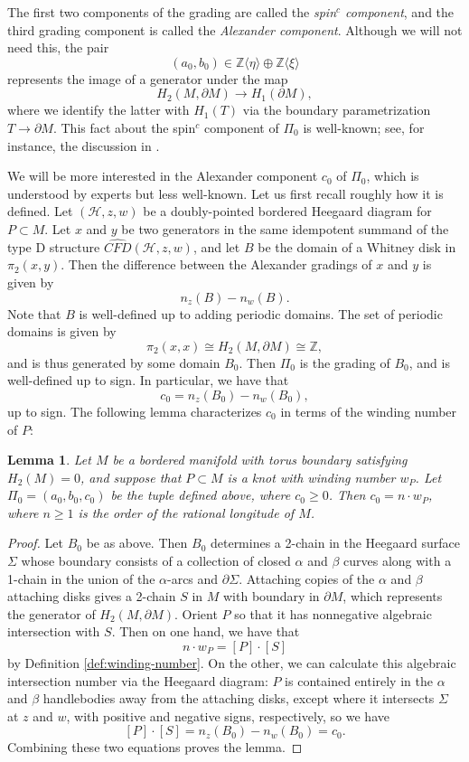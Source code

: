 \documentclass[11pt]{amsart}
\newtheorem {lemma}[theorem]{Lemma}
\numberwithin{equation}{section}
\numberwithin{theorem}{section}
\theoremstyle{definition}
\newcommand{\Z}{\mathbb{Z}}
\newcommand{\CFD}{\widehat{\mathit{CFD}}}
\begin{document}
The first two components of the grading are called the \emph{spin$^c$ component}, and the third grading component is called the \emph{Alexander component}. Although we will not need this, the pair \[(a_0,b_0)\in\Z\langle \eta\rangle \oplus \Z\langle \xi\rangle\] represents the image of a generator under the map \[H_2(M,\partial M) \to H_1(\partial M),\] where we identify the latter with $H_1(T)$ via the boundary parametrization $T \to \partial M$. This fact about the spin$^c$ component of $\Pi_0$ is well-known; see, for instance, the discussion in \cite[\S2.2]{hrw-properties}.

We will be more interested in the Alexander component $c_0$ of $\Pi_0$, which is understood by experts but less well-known. Let us first recall roughly how it is defined. Let $(\mathcal{H},z,w)$ be a doubly-pointed bordered Heegaard diagram for $P\subset M$. Let  $x$ and $y$ be two generators in the same idempotent summand of the type D structure $\CFD(\mathcal{H},z,w)$, and let $B$ be the domain of a Whitney disk in $\pi_2(x,y)$. Then the difference between the Alexander gradings of $x$ and $y$ is given by \[n_z(B)-n_w(B).\] Note that $B$ is well-defined up to adding periodic domains.  The set of periodic domains is given by \[\pi_2(x,x)\cong H_2(M,\partial M) \cong \Z,\] and is thus generated by some domain $B_0$. Then $\Pi_0$ is the grading of $B_0$, and is well-defined up to sign. In particular, we have that \[c_0 = n_z(B_0)-n_w(B_0),\] up to sign. The following lemma characterizes $c_0$ in terms of the winding number of $P$:

\begin{lemma}\label{lem:periodic-grading}
Let $M$ be a bordered manifold with torus boundary satisfying $H_2(M)=0$, and suppose that $P\subset M$ is a knot with winding number $w_P$. Let $\Pi_0 = (a_0, b_0,c_0)$ be the tuple defined above, where $c_0\geq 0$. Then $c_0 = n\cdot w_P$, where $n \geq 1$ is the order of the rational longitude of $M$.
\end{lemma}

\begin{proof}
Let $B_0$ be as above. Then $B_0$ determines a 2-chain in the Heegaard surface $\Sigma$ whose boundary consists of a collection of closed $\alpha$ and $\beta$ curves along with a 1-chain in the union of the $\alpha$-arcs and $\partial \Sigma$. Attaching copies of the $\alpha$ and $\beta$ attaching disks gives a 2-chain $S$ in $M$ with boundary in $\partial M$, which represents the generator of $H_2(M,\partial M)$. Orient $P$ so that it has nonnegative algebraic intersection with $S$. Then on one hand, we have that \[n\cdot w_P = [P]\cdot [S]\] by Definition \ref{def:winding-number}. On the other, we can calculate this algebraic intersection number via the Heegaard diagram: $P$ is contained entirely in the $\alpha$ and $\beta$ handlebodies away from the attaching disks, except where it intersects $\Sigma$ at $z$ and $w$, with positive and negative signs, respectively, so we have \[[P]\cdot [S] = n_{z}(B_0) - n_w(B_0) = c_0.\] Combining these two equations proves the lemma.
\end{proof}
\end{document}
